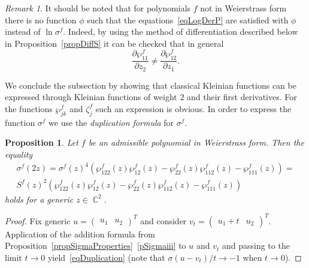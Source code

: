 \documentclass{amsart}
\numberwithin{equation}{section}
\newtheorem{proposition}[theorem]{Proposition}
\theoremstyle{definition}
\theoremstyle{remark}
\newtheorem*{remark}{Remark}
\DeclareMathOperator{\CC}{\mathbb C}
\begin{document}
	\begin{remark}
		It should be noted that for polynomials $f$ not in Weierstrass form there is no function $\phi$ such that the equations~\eqref{eqLogDerP} are satisfied with $\phi$ instead of $\ln \sigma^f$. Indeed, by using the method of differentiation described below in Proposition~\ref{propDiffS} it can be checked that in general \[
		\frac{\partial \wp_{11}^f}{\partial z_2} \ne \frac{\partial \wp_{12}^f}{\partial z_1}.
		\]
	\end{remark}
	
	We conclude the subsection by showing that classical Kleinian functions can be expressed through Kleinian functions of weight $2$ and their first derivatives. For the functions $\wp_{jk}^f$ and $\zeta_j^f$ such an expression is obvious. In order to express the function $\sigma^f$ we use the {\it{duplication formula}} for $\sigma^f$.
	\begin{proposition}\label{propDuplication}
		Let $f$ be an admissible polynomial in Weierstrass form. Then the equality
		\begin{multline}\label{eqDuplication}
			\sigma^f(2z) = \sigma^f(z)^4(\wp_{122}^f(z)\wp_{12}^f(z) - \wp_{22}^f(z)\wp_{112}^f(z) - \wp_{111}^f(z)) = \\ S^f(z)^2(\wp_{122}^f(z)\wp_{12}^f(z) - \wp_{22}^f(z)\wp_{112}^f(z) - \wp_{111}^f(z))
		\end{multline}
		holds for a generic $z \in \CC^2$.
	\end{proposition}
	\begin{proof}
		Fix generic $u = \begin{pmatrix} u_1 & u_2 \end{pmatrix}^T$ and consider $v_t = \begin{pmatrix} u_1 + t & u_2\end{pmatrix}^T$. Application of the addition formula from Proposition~\ref{propSigmaProperties}~\ref{pSigmaiii} to $u$ and $v_t$ and passing to the limit $t \to 0$ yield~\eqref{eqDuplication} (note that $\sigma(u - v_t)/t \to -1$ when $t \to 0$).
	\end{proof}
	
\end{document}
